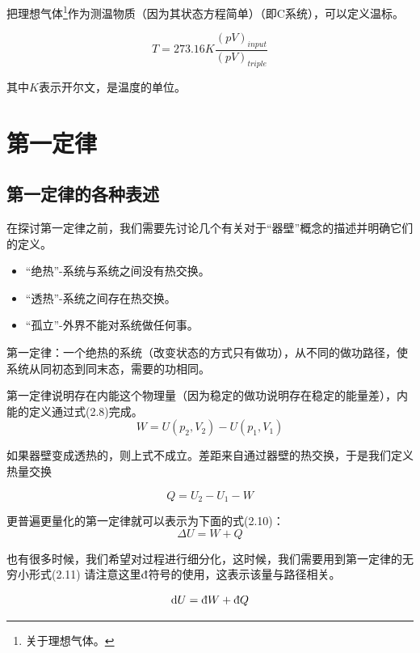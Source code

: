 \documentclass[a4paper, 10pt, openany]{book}%
\begin{document}
把理想气体\footnote{关于理想气体。}作为测温物质（因为其状态方程简单）（即C系统），可以定义温标。

\begin{equation}T=273.16K\frac{(pV)_{input}}{(pV)_{triple}}\end{equation}

其中$K$表示开尔文，是温度的单位。
\section{第一定律}

\subsection{第一定律的各种表述}
在探讨第一定律之前，我们需要先讨论几个有关对于“器壁”概念的描述并明确它们的定义。
\begin{itemize}
  \item “绝热”-系统与系统之间没有热交换。
 \item  “透热”-系统之间存在热交换。
 \item “孤立”-外界不能对系统做任何事。

\end{itemize}

\vspace{10pt}

第一定律：一个绝热的系统（改变状态的方式只有做功），从不同的做功路径，使系统从同初态到同末态，需要的功相同。

\vspace{10pt}

第一定律说明存在内能这个物理量（因为稳定的做功说明存在稳定的能量差），内能的定义通过式(2.8)完成。
\begin{equation}
W=U(p_2,V_2)-U(p_1,V_1)
\end{equation}

如果器壁变成透热的，则上式不成立。差距来自通过器壁的热交换，于是我们定义热量交换

\begin{equation}
  Q=U_2-U_1-W
  \end{equation}

更普遍更量化的第一定律就可以表示为下面的式(2.10)：
\begin{equation}\Delta U=W+Q\end{equation}

也有很多时候，我们希望对过程进行细分化，这时候，我们需要用到第一定律的无穷小形式(2.11)
请注意这里$\text{\dj}$符号的使用，这表示该量与路径相关。


\begin{equation}\mathrm{d}U=\text{\dj}W+\text{\dj}Q\end{equation}
\end{document}
